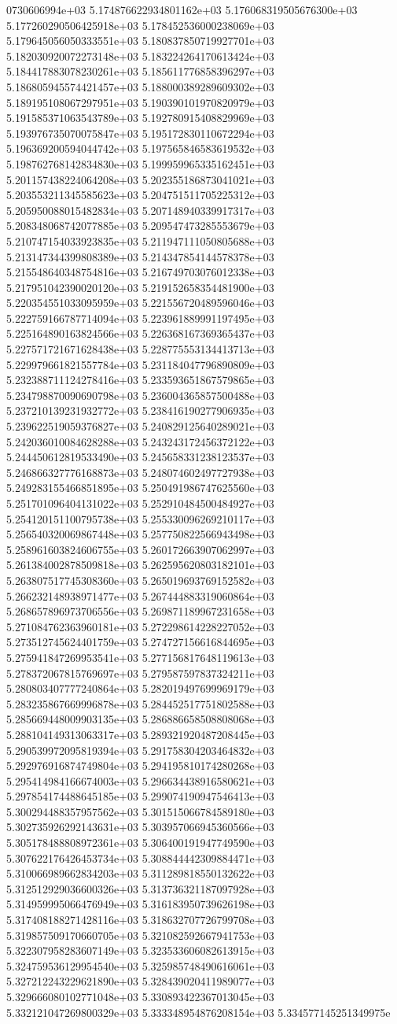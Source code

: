 0730606994e+03	5.174876622934801162e+03	5.176068319505676300e+03	5.177260290506425918e+03	5.178452536000238069e+03	5.179645056050333551e+03	5.180837850719927701e+03	5.182030920072273148e+03	5.183224264170613424e+03	5.184417883078230261e+03	5.185611776858396297e+03	5.186805945574421457e+03	5.188000389289609302e+03	5.189195108067297951e+03	5.190390101970820979e+03	5.191585371063543789e+03	5.192780915408829969e+03	5.193976735070075847e+03	5.195172830110672294e+03	5.196369200594044742e+03	5.197565846583619532e+03	5.198762768142834830e+03	5.199959965335162451e+03	5.201157438224064208e+03	5.202355186873041021e+03	5.203553211345585623e+03	5.204751511705225312e+03	5.205950088015482834e+03	5.207148940339917317e+03	5.208348068742077885e+03	5.209547473285553679e+03	5.210747154033923835e+03	5.211947111050805688e+03	5.213147344399808389e+03	5.214347854144578378e+03	5.215548640348754816e+03	5.216749703076012338e+03	5.217951042390020120e+03	5.219152658354481900e+03	5.220354551033095959e+03	5.221556720489596046e+03	5.222759166787714094e+03	5.223961889991197495e+03	5.225164890163824566e+03	5.226368167369365437e+03	5.227571721671628438e+03	5.228775553134413713e+03	5.229979661821557784e+03	5.231184047796890809e+03	5.232388711124278416e+03	5.233593651867579865e+03	5.234798870090690798e+03	5.236004365857500488e+03	5.237210139231932772e+03	5.238416190277906935e+03	5.239622519059376827e+03	5.240829125640289021e+03	5.242036010084628288e+03	5.243243172456372122e+03	5.244450612819533490e+03	5.245658331238123537e+03	5.246866327776168873e+03	5.248074602497727938e+03	5.249283155466851895e+03	5.250491986747625560e+03	5.251701096404131022e+03	5.252910484500484927e+03	5.254120151100795738e+03	5.255330096269210117e+03	5.256540320069867448e+03	5.257750822566943498e+03	5.258961603824606755e+03	5.260172663907062997e+03	5.261384002878509818e+03	5.262595620803182101e+03	5.263807517745308360e+03	5.265019693769152582e+03	5.266232148938971477e+03	5.267444883319060864e+03	5.268657896973706556e+03	5.269871189967231658e+03	5.271084762363960181e+03	5.272298614228227052e+03	5.273512745624401759e+03	5.274727156616844695e+03	5.275941847269953541e+03	5.277156817648119613e+03	5.278372067815769697e+03	5.279587597837324211e+03	5.280803407777240864e+03	5.282019497699969179e+03	5.283235867669996878e+03	5.284452517751802588e+03	5.285669448009903135e+03	5.286886658508808068e+03	5.288104149313063317e+03	5.289321920487208445e+03	5.290539972095819394e+03	5.291758304203464832e+03	5.292976916874749804e+03	5.294195810174280268e+03	5.295414984166674003e+03	5.296634438916580621e+03	5.297854174488645185e+03	5.299074190947546413e+03	5.300294488357957562e+03	5.301515066784589180e+03	5.302735926292143631e+03	5.303957066945360566e+03	5.305178488808972361e+03	5.306400191947749590e+03	5.307622176426453734e+03	5.308844442309884471e+03	5.310066989662834203e+03	5.311289818550132622e+03	5.312512929036600326e+03	5.313736321187097928e+03	5.314959995066476949e+03	5.316183950739626198e+03	5.317408188271428116e+03	5.318632707726799708e+03	5.319857509170660705e+03	5.321082592667941753e+03	5.322307958283607149e+03	5.323533606082613915e+03	5.324759536129954540e+03	5.325985748490616061e+03	5.327212243229621890e+03	5.328439020411989077e+03	5.329666080102771048e+03	5.330893422367013045e+03	5.332121047269800329e+03	5.333348954876208154e+03	5.334577145251349975e